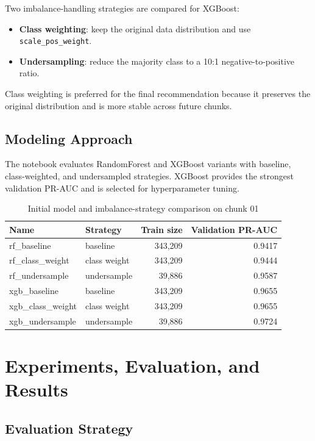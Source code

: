\documentclass[12pt,a4paper]{article}
\begin{document}
Two imbalance-handling strategies are compared for XGBoost:
\begin{itemize}
    \item \textbf{Class weighting}: keep the original data distribution and use \texttt{scale\_pos\_weight}.
    \item \textbf{Undersampling}: reduce the majority class to a 10:1 negative-to-positive ratio.
\end{itemize}

Class weighting is preferred for the final recommendation because it preserves the original distribution and is more stable across future chunks.

\subsection{Modeling Approach}

The notebook evaluates RandomForest and XGBoost variants with baseline, class-weighted, and undersampled strategies. XGBoost provides the strongest validation PR-AUC and is selected for hyperparameter tuning.

\begin{table}[H]
\centering
\caption{Initial model and imbalance-strategy comparison on chunk 01}
\begin{tabular}{llrr}
\toprule
\textbf{Name} & \textbf{Strategy} & \textbf{Train size} & \textbf{Validation PR-AUC} \\
\midrule
rf\_baseline & baseline & 343,209 & 0.9417 \\
rf\_class\_weight & class weight & 343,209 & 0.9444 \\
rf\_undersample & undersample & 39,886 & 0.9587 \\
xgb\_baseline & baseline & 343,209 & 0.9655 \\
xgb\_class\_weight & class weight & 343,209 & 0.9655 \\
xgb\_undersample & undersample & 39,886 & 0.9724 \\
\bottomrule
\end{tabular}
\end{table}

\section{Experiments, Evaluation, and Results}

\subsection{Evaluation Strategy}
\end{document}
